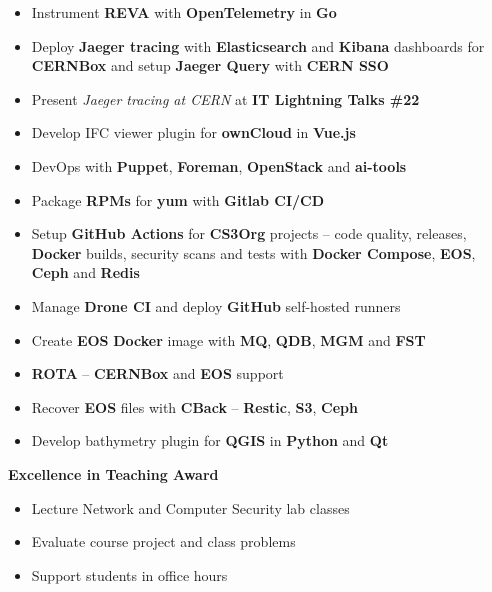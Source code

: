 \documentclass[10pt,a4paper,ragged2e,withhyper]{altacv}
\begin{document}
\begin{paracol}{2}
\begin{itemize}
\item Instrument \textbf{REVA} with \textbf{OpenTelemetry} in \textbf{Go}
\item Deploy \textbf{Jaeger tracing} with \textbf{Elasticsearch} and \textbf{Kibana} dashboards for \textbf{CERNBox} and setup \textbf{Jaeger Query} with \textbf{CERN SSO}
\item Present \emph{Jaeger tracing at CERN} at \textbf{IT Lightning Talks \#22}
\item Develop IFC viewer plugin for \textbf{ownCloud} in \textbf{Vue.js}
\item DevOps with \textbf{Puppet}, \textbf{Foreman}, \textbf{OpenStack} and \textbf{ai-tools}
\item Package \textbf{RPMs} for \textbf{yum} with \textbf{Gitlab CI/CD}
\item Setup \textbf{GitHub Actions} for \textbf{CS3Org} projects -- code quality, releases, \textbf{Docker} builds, security scans and tests with \textbf{Docker Compose}, \textbf{EOS}, \textbf{Ceph} and \textbf{Redis}
\item Manage \textbf{Drone CI} and deploy \textbf{GitHub} self-hosted runners
\item Create \textbf{EOS} \textbf{Docker} image with \textbf{MQ}, \textbf{QDB}, \textbf{MGM} and \textbf{FST}
\item \textbf{ROTA} -- \textbf{CERNBox} and \textbf{EOS} support
\item Recover \textbf{EOS} files with \textbf{CBack} -- \textbf{Restic}, \textbf{S3}, \textbf{Ceph}
\end{itemize}

\switchcolumn

\begin{itemize}
\item Develop bathymetry plugin for \textbf{QGIS} in \textbf{Python} and \textbf{Qt}
\end{itemize}
\divider

\faAward \hspace{0.05cm} \textbf{Excellence in Teaching Award}
\smallskip
\begin{itemize}
\item Lecture Network and Computer Security lab classes
\item Evaluate course project and class problems
\item Support students in office hours
\end{itemize}
\divider


\end{paracol}
\end{document}
